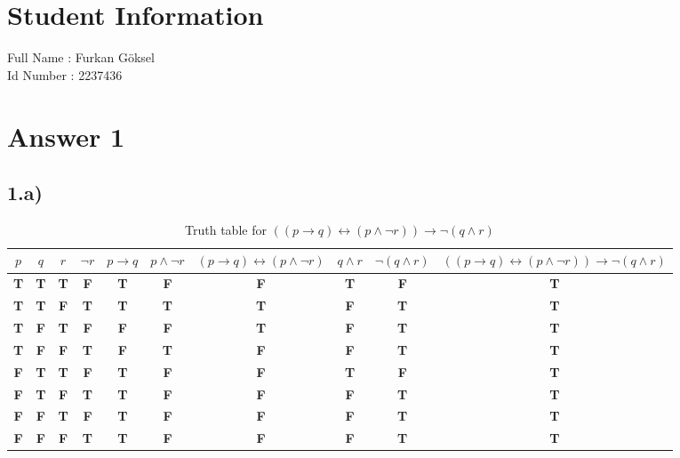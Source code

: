 \documentclass[12pt]{article}
\begin{document}
\section*{Student Information } 
Full Name : Furkan Göksel \\
Id Number : 2237436 \\

\section*{Answer 1}
\subsection*{1.a)}
\begin{table}[H]
\small
\centering
\caption{ Truth table for $((p \to q)\leftrightarrow(p \land \neg r)) \to \neg(q \land r)$  }
\label{table:example}
\begin{tabular}{|c|c|c|c|c|c|c|c|c|c|}	%
\hline 							%
\textbf{$p$} & \textbf{$q$} & \textbf{$r$} & \textbf{$ \neg r$} & \textbf{$p \to q$} & \textbf{$p \land \neg r $} & \textbf{$(p \to q)\leftrightarrow(p \land \neg r)$} & \textbf{$q \land r$} & \textbf{$\neg(q \land r)$} &\textbf{$((p \to q)\leftrightarrow(p \land \neg r)) \to \neg(q \land r)$} \\
\hline 
\hline
\textbf{T} & \textbf{T} & \textbf{T} & \textbf{F} & \textbf{T} & \textbf{F} & \textbf{F} & \textbf{T} & \textbf{F} & \textbf{T}\\	
\hline
\textbf{T} & \textbf{T} & \textbf{F} & \textbf{T} & \textbf{T} & \textbf{T} & \textbf{T} & \textbf{F} & \textbf{T} & \textbf{T}\\
\hline
\textbf{T} & \textbf{F} & \textbf{T} & \textbf{F} & \textbf{F} & \textbf{F} & \textbf{T} & \textbf{F} & \textbf{T} & \textbf{T}\\
\hline
\textbf{T} & \textbf{F} & \textbf{F} & \textbf{T} & \textbf{F} & \textbf{T} & \textbf{F} & \textbf{F} & \textbf{T} & \textbf{T}\\
\hline
\textbf{F} & \textbf{T} & \textbf{T} & \textbf{F} & \textbf{T} & \textbf{F} & \textbf{F} & \textbf{T} & \textbf{F} & \textbf{T}\\
\hline
\textbf{F} & \textbf{T} & \textbf{F} & \textbf{T} & \textbf{T} & \textbf{F} & \textbf{F} & \textbf{F} & \textbf{T} & \textbf{T}\\
\hline
\textbf{F} & \textbf{F} & \textbf{T} & \textbf{F} & \textbf{T} & \textbf{F} & \textbf{F} & \textbf{F} & \textbf{T} & \textbf{T}\\
\hline
\textbf{F} & \textbf{F} & \textbf{F} & \textbf{T} & \textbf{T} & \textbf{F} & \textbf{F} & \textbf{F} & \textbf{T} & \textbf{T}\\
\hline


\end{tabular}
\end{table}
\end{document}
